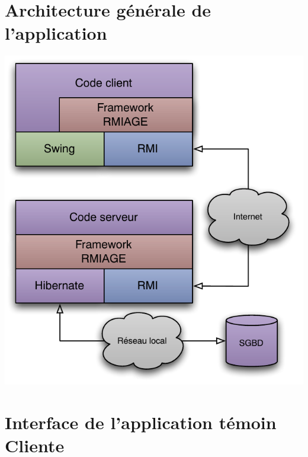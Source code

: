\appendix

\section{Architecture générale de l'application}
\label{archi_generale}

\includegraphics{../diagrammes/architecture.pdf}

\section{Interface de l'application témoin Cliente}
\label{screen_client}